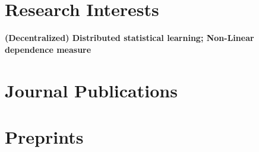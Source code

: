 \documentclass[margin,line]{resume-bib}
\begin{document}
\begin{resume}
\section{\mysidestyle Research Interests}\vspace{1mm}	
    {\bf (Decentralized) Distributed statistical learning; Non-Linear dependence measure} 



\section{\mysidestyle Journal Publications}\vspace{1mm}	
\begin{refsection} %
\nocite{chen2022DistributedDecodingHeterogeneous,chen2022DistributedEstimationHeterogeneous,chen2024DistributedSparseComposite,zhang2022SlicedIndependenceTest,Song2020,he2022DistributedEstimationHigh,chen2022ScalableGloballyConvergent}

\printbibliography[heading=none]
\end{refsection}

\section{\mysidestyle Preprints}
\begin{refsection} %
\nocite{chen2022FastOptimizationMethods,chen2022RobustMultiTask,chen2022DistributedEstimationGap,chen2022DecentralizedDistributedEstimation,chen2022RobustFastLowRank,chen2022CommunicationEfficientDistributedSupportVectorMachine}

\printbibliography[heading=none]
\end{refsection}



\end{resume}
\end{document}

